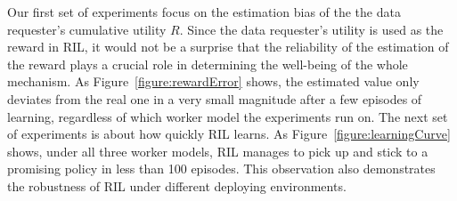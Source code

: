 %

Our first set of experiments focus on the estimation bias of the the data requester's cumulative utility $R$.
Since the data requester's utility is used as the reward in RIL, it would not be a surprise that the reliability of the estimation of the reward plays a crucial role in determining the well-being of the whole mechanism. As Figure~\ref{figure:rewardError} shows, the estimated value only deviates from the real one in a very small magnitude after a few episodes of learning, regardless of which worker model the experiments run on.
The next set of experiments is about how quickly RIL learns. As Figure~\ref{figure:learningCurve} shows, under all three worker models, RIL manages to pick up and stick to a promising policy %
in less than 100 episodes. 
This observation also demonstrates the robustness of RIL under different deploying environments.

